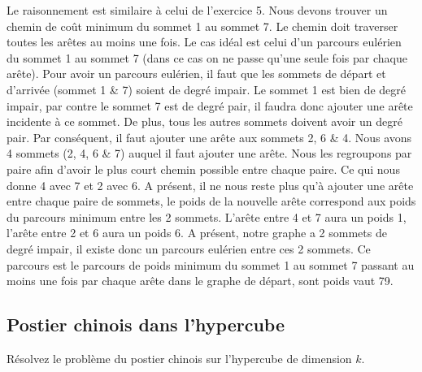 \begin{solution}
Le raisonnement est similaire à celui de l'exercice 5. Nous devons
trouver un chemin de coût minimum du sommet 1 au sommet 7. Le chemin
doit traverser toutes les arêtes au moins une fois. Le cas idéal est
celui d'un parcours eulérien du sommet 1 au sommet 7 (dans ce cas
on ne passe qu'une seule fois par chaque arête). Pour avoir un parcours
eulérien, il faut que les sommets de départ et d'arrivée (sommet 1
\& 7) soient de degré impair. Le sommet 1 est bien de degré impair,
par contre le sommet 7 est de degré pair, il faudra donc ajouter une
arête incidente à ce sommet. De plus, tous les autres sommets doivent
avoir un degré pair. Par conséquent, il faut ajouter une arête aux
sommets 2, 6 \& 4. Nous avons 4 sommets (2, 4, 6 \& 7) auquel il faut
ajouter une arête. Nous les regroupons par paire afin d'avoir le plus
court chemin possible entre chaque paire. Ce qui nous donne 4 avec
7 et 2 avec 6. A présent, il ne nous reste plus qu'à ajouter une arête
entre chaque paire de sommets, le poids de la nouvelle arête correspond
aux poids du parcours minimum entre les 2 sommets. L'arête entre 4
et 7 aura un poids 1, l'arête entre 2 et 6 aura un poids 6. A présent,
notre graphe a 2 sommets de degré impair, il existe donc un parcours
eulérien entre ces 2 sommets. Ce parcours est le parcours de poids
minimum du sommet 1 au sommet 7 passant au moins une fois par chaque
arête dans le graphe de départ, sont poids vaut 79.
\end{solution}
\subsection{Postier chinois dans l'hypercube} Résolvez le problème du postier chinois sur l'hypercube de dimension $k$.
